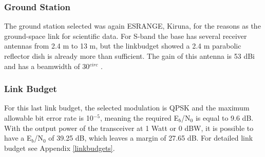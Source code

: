\subsubsection{Ground Station}
The ground station selected was again ESRANGE, Kiruna, for the reasons as the ground-space link for scientific data. For S-band the base has several receiver antennas from 2.4 m to 13 m, but the linkbudget showed a 2.4 m parabolic reflector dish is already more than sufficient. The gain of this antenna is 53 dBi and has a beamwidth of 30$^{circ}$ \cite{esrange}.

\subsubsection{Link Budget}
For this last link budget, the selected modulation is QPSK and the maximum allowable bit error rate is 10$^{-5}$, meaning the required E$_{b}$/N$_{0}$ is equal to 9.6 dB. With the output power of the transceiver at 1 Watt or 0 dBW, it is possible to have a E$_{b}$/N$_{0}$ of 39.25 dB, which leaves a margin of 27.65 dB. For detailed link budget see Appendix \ref{linkbudgets}.


